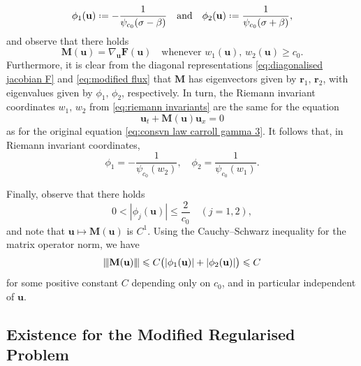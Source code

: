 \documentclass[11pt,a4paper,reqno]{amsart}
\numberwithin{equation}{section}
\theoremstyle{definition}
\theoremstyle{remark}
\newcommand{\vertiii}[1]{{\left\vert\kern-0.25ex\left\vert\kern-0.25ex\left\vert #1 
    \right\vert\kern-0.25ex\right\vert\kern-0.25ex\right\vert}}
\newcommand{\bu}{\mathbf{u}}
\newcommand{\bF}{\mathbf{F}}
\newcommand{\br}{\mathbf{r}}
\newcommand{\bM}{\mathbf{M}}
\renewcommand{\leq}{\leqslant}
\renewcommand{\geq}{\geqslant}
\newcommand*{\defeq}{\mathrel{\vcenter{\baselineskip0.5ex \lineskiplimit0pt
                     \hbox{\scriptsize.}\hbox{\scriptsize.}}}%
                     =}
\begin{document}
{\begin{equation*}
    \phi_1(\bu)  \defeq  -\frac{1}{\psi_{c_0}(\sigma-\beta)}  \quad \text{and} \quad 
    \phi_2(\bu)  \defeq  \frac{1}{\psi_{c_0}(\sigma+\beta)}, 
\end{equation*}
and observe that there holds 
\begin{equation}\label{eq:modified flux coincides in good region}
    \bM(\bu) = \nabla_\bu \bF(\bu) \quad \text{whenever } w_1(\bu), \, w_2(\bu) \geq c_0. 
\end{equation}
Furthermore, it is clear from the diagonal representations \eqref{eq:diagonalised jacobian F} and \eqref{eq:modified flux} that $\bM$ has eigenvectors given by $\br_1, \, \br_2$, with eigenvalues given by $\phi_1, \, \phi_2$, respectively. In turn, the Riemann invariant coordinates $w_1, \, w_2$ from \eqref{eq:riemann invariants} are the same for the equation 
\begin{equation*}
    \bu_t + \bM(\bu) \bu_x = 0 
\end{equation*}
as for the original equation \eqref{eq:consvn law carroll gamma 3}. It follows that, in Riemann invariant coordinates, 
\begin{equation}\label{eq:eigenvalues in terms of riemann invariants}
    \phi_1 = -\frac{1}{\psi_{c_0}(w_2)}  , \quad 
    \phi_2 = \frac{1}{\psi_{c_0}(w_1)}. 
\end{equation}


Finally, observe that there holds 
\begin{equation*}
    0 < |\phi_j(\bu)| \leq \frac{2}{c_0} \quad (j=1,2), 
\end{equation*}
and note that $\bu \mapsto \bM(\bu)$ is $C^1$. Using the Cauchy--Schwarz inequality for the matrix operator norm, we have 
\begin{equation}\label{eq:op norm of auxiliary M}
    \vertiii{\bM(\bu)} \leq C \big( |\phi_1(\bu)| + |\phi_2(\bu)| \big) \leq C 
\end{equation}
for some positive constant $C$ depending only on $c_0$, and in particular independent of $\bu$. 














\subsection{Existence for the Modified Regularised Problem}


}
\end{document}

